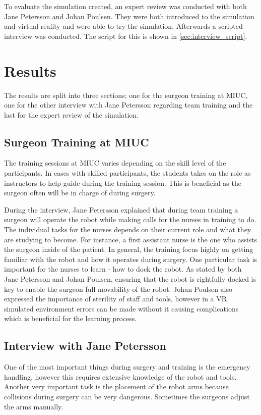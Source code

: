 \documentclass[paper=a4, fontsize=11pt]{scrartcl} %
\numberwithin{equation}{section} %
\numberwithin{figure}{section} %
\numberwithin{table}{section} %
\begin{document}
To evaluate the simulation created, an expert review was conducted with both Jane Petersson and Johan Poulsen.  They were both introduced to the simulation and virtual reality and were able to try the simulation. Afterwards a scripted interview was conducted. The script for this is shown in \autoref{sec:interview_script}.

\section{Results}
The results are split into three sections; one for the surgeon training at MIUC, one for the other interview with Jane Petersson regarding team training and the last for the expert review of the simulation.

\subsection{Surgeon Training at MIUC}
The training sessions at MIUC varies depending on the skill level of the participants. In cases with skilled participants, the students takes on the role as instructors to help guide during the training session. This is beneficial as the surgeon often will be in charge of during surgery.

During the interview, Jane Petersson explained that during team training a surgeon will operate the robot while making calls for the nurses in training to do. The individual tasks for the nurses depends on their current role and what they are studying to become. For instance, a first assistant nurse is the one who assists the surgeon inside of the patient. In general, the training focus highly on getting familiar with the robot and how it operates during surgery. One particular task is important for the nurses to learn - how to dock the robot. As stated by both Jane Petersson and Johan Poulsen, ensuring that the robot is rightfully docked is key to enable the surgeon full movability of the robot. Johan Poulsen also expressed the importance of sterility of staff and tools, however in a VR simulated environment errors can be made without it causing complications which is beneficial for the learning process.

\subsection{Interview with Jane Petersson}
One of the most important things during surgery and training is the emergency handling, however this requires extensive knowledge of the robot and tools. Another very important task is the placement of the robot arms because collisions during surgery can be very dangerous. Sometimes the surgeons adjust the arms manually.
\end{document}
